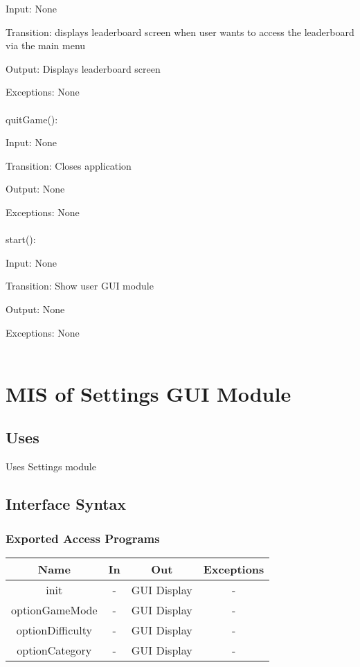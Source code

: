 \documentclass[12,english]{article}
\begin{document}
		Input: None
		
		Transition: displays leaderboard screen when user wants to access the leaderboard via the main menu

		Output: Displays leaderboard screen
		
		Exceptions: None\\
		\\
		quitGame():
		
		Input: None
		
		Transition: Closes application
		
		Output: None
		
		Exceptions: None\\
		\\
		start():
		
		Input: None
		
		Transition: Show user GUI module
		
		Output: None
		
		Exceptions: None\\
		\\


\section{MIS of Settings GUI Module}
        \subsection{Uses}
        Uses Settings module
		\subsection{Interface Syntax}
		\subsubsection{Exported Access Programs}
		\begin{tabular}[pos]{|c|c|c|c|}
			
			\hline
			\textbf{Name}& \textbf{In} & \textbf{Out} & \textbf{Exceptions} \\ \hline
			init & - & GUI Display & -\\ \hline
			optionGameMode & - & GUI Display & - \\ \hline
			optionDifficulty & - & GUI Display & - \\ \hline
			optionCategory & - & GUI Display & - \\ \hline
			
		\end{tabular}
		
\end{document}

